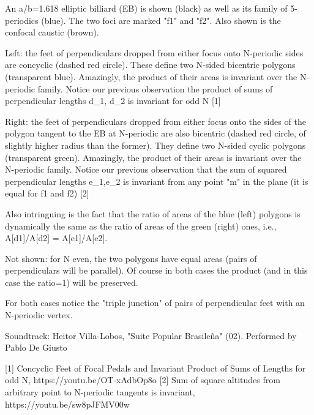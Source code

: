 An a/b=1.618 elliptic billiard (EB) is shown (black) as well as its family of 5-periodics (blue). The two foci are marked "f1" and "f2". Also shown is the confocal caustic (brown).

Left: the feet of perpendiculars dropped from either focus onto N-periodic sides are concyclic (dashed red circle). These define two N-sided bicentric polygons (transparent blue). Amazingly, the product of their areas is invariant over the N-periodic family. Notice our previous observation the product of sums of perpendicular lengths d_1, d_2 is invariant for odd N [1]

Right: the feet of perpendiculars dropped from either focus onto the sides of the polygon tangent to the EB at N-periodic are also bicentric (dashed red circle, of slightly higher radius than the former). They define two N-sided cyclic polygons (transparent green). Amazingly, the product of their areas is invariant over the N-periodic family. Notice our previous observation that the sum of squared perpendicular lengths e_1,e_2 is invariant from any point "m" in the plane (it is equal for f1 and f2) [2]

Also intringuing is the fact that the ratio of areas of the blue (left) polygons is dynamically the same as the ratio of areas of the green (right) ones, i.e., A[d1]/A[d2] = A[e1]/A[e2].

Not shown: for N even, the two polygons have equal areas (pairs of perpendiculars will be parallel). Of course in both cases the product (and in this case the ratio=1) will be preserved.

For both cases notice the "triple junction" of pairs of perpendicular feet with an N-periodic vertex.

Soundtrack: Heitor Villa-Lobos, "Suite Popular Brasileña" (02). Performed by Pablo De Giusto

[1] Concyclic Feet of Focal Pedals and Invariant Product of Sums of Lengths for odd N, https://youtu.be/OT-xAdbOp8o
[2] Sum of square altitudes from arbitrary point to N-periodic tangents is invariant, https://youtu.be/sw8pJFMV00w